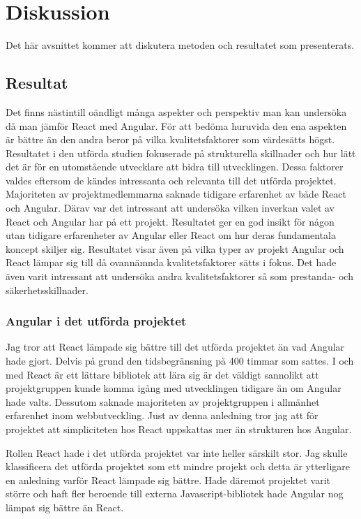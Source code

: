 \section{Diskussion}
\label{sec:axel-discussion}
Det här avsnittet kommer att diskutera metoden och resultatet som presenterats. 

\subsection{Resultat}
\label{subsec:axel-discussion-results}
Det finns nästintill oändligt många aspekter och perspektiv man kan undersöka då man jämför React med Angular. För att bedöma huruvida den ena aspekten är bättre än den andra beror på vilka kvalitetsfaktorer som värdesätts högst. Resultatet i den utförda studien fokuserade på strukturella skillnader och hur lätt det är för en utomstående utvecklare att bidra till utvecklingen. Dessa faktorer valdes eftersom de kändes intressanta och relevanta till det utförda projektet. Majoriteten av projektmedlemmarna saknade tidigare erfarenhet av både React och Angular. Därav var det intressant att undersöka vilken inverkan valet av React och Angular har på ett projekt. Resultatet ger en god insikt för någon utan tidigare erfarenheter av Angular eller React om hur deras fundamentala koncept skiljer sig. Resultatet visar även på vilka typer av projekt Angular och React lämpar sig till då ovannämnda kvalitetsfaktorer sätts i fokus. Det hade även varit intressant att undersöka andra kvalitetsfaktorer så som prestanda- och säkerhetsskillnader.

\subsubsection{Angular i det utförda projektet}
Jag tror att React lämpade sig bättre till det utförda projektet än vad Angular hade gjort. Delvis på grund den tidsbegränsning på 400 timmar som sattes. I och med React är ett lättare bibliotek att lära sig är det väldigt sannolikt att projektgruppen kunde komma igång med utvecklingen tidigare än om Angular hade valts. Dessutom saknade majoriteten av projektgruppen i allmänhet erfarenhet inom webbutveckling. Just av denna anledning tror jag att för projektet att simpliciteten hos React uppskattas mer än strukturen hos Angular.

Rollen React hade i det utförda projektet var inte heller särskilt stor. Jag skulle klassificera det utförda projektet som ett mindre projekt och detta är ytterligare en anledning varför React lämpade sig bättre. Hade däremot projektet varit större och haft fler beroende till externa Javascript-bibliotek hade Angular nog lämpat sig bättre än React.


